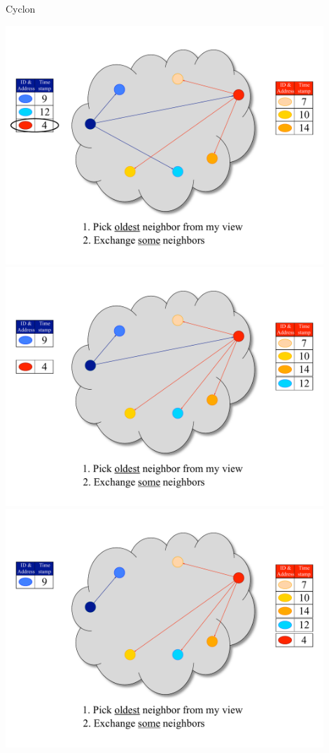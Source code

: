 \begin{frame}{Cyclon}
\begin{overprint}
\includegraphics[width=0.9\textwidth]{figs/11/4_cyclon}
\includegraphics[width=0.9\textwidth]{figs/11/5_cyclon}
\includegraphics[width=0.9\textwidth]{figs/11/6_cyclon}

\end{overprint}
\end{frame}
